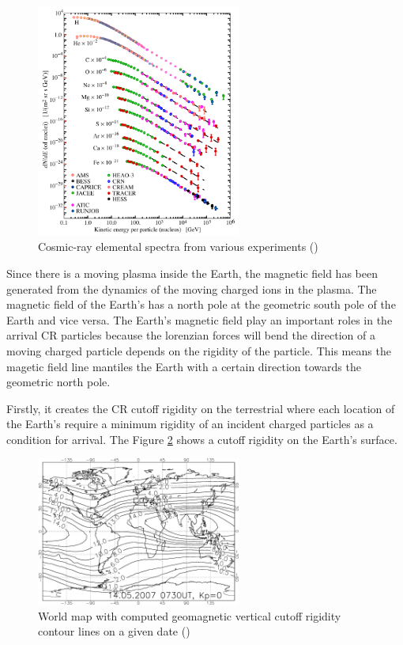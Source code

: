 \begin{figure}[h!]
    \centering
    \includegraphics[width=0.6\textwidth]{content/literature_review/figures/cr_composition.png}
    \caption{Cosmic-ray elemental spectra from various experiments (\cite{review_particle_physics2012})}
    \label{fig:cr_composition}
\end{figure}


Since there is a moving plasma inside the Earth, the magnetic field 
has been generated from the dynamics of the moving charged ions in 
the plasma. The magnetic field of the Earth's has a north pole at 
the geometric south pole of the Earth and vice versa. 
The Earth's magnetic field play
an important roles in the arrival CR particles because the lorenzian 
forces will bend the direction of a moving charged particle depends 
on the rigidity of the particle.
This means the magetic field line mantiles the Earth with a
certain direction towards the geometric north pole.

Firstly, it creates the CR cutoff rigidity on the terrestrial
where each location of the Earth's require a minimum rigidity of 
an incident charged particles as a condition for arrival. The 
Figure \ref{fig:cr_map_rigidity} shows a cutoff rigidity on the Earth's surface.

\begin{figure}[h!]
    \centering
    \includegraphics[width=0.6\textwidth]{content/literature_review/figures/map_cutoff_rigidity.png}
    \caption{ World map with computed geomagnetic vertical cutoff
        rigidity contour lines on a given date
        (\cite{map_cr_rigidity_cutoff})
    }
    \label{fig:cr_map_rigidity}
\end{figure}

